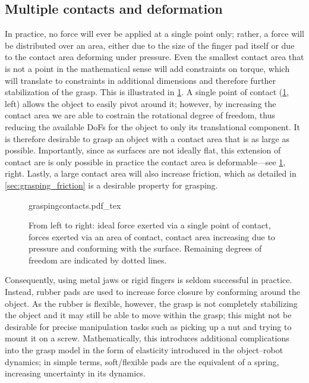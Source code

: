 \subsection{Multiple contacts and deformation}\label{sec:grasping_deformation}

In practice, no force will ever be applied at a single point only; rather, a force will be distributed over an area, either due to the size of the finger pad itself or due to the contact area deforming under pressure.
Even the smallest contact area that is not a point in the mathematical sense will add constraints on torque, which will translate to constraints in additional dimensions and therefore further stabilization of the grasp. This is illustrated in \cref{fig:contactarea}.
A single point of contact (\cref{fig:contactarea}, left) allows the object to easily pivot around it; however, by increasing the contact area we are able to costrain the rotational degree of freedom, thus reducing the available DoFs for the object to only its translational component.
It is therefore desirable to grasp an object with a contact area that is as large as possible. Importantly, since as surfaces are not ideally flat, this extension of contact are is only possible in practice the contact area is deformable---see \cref{fig:contactarea}, right. Lastly, a large contact area will also increase friction, which as detailed in \cref{sec:grasping_friction} is a desirable property for grasping.

\begin{figure}
    \def\svgwidth{\textwidth}
    {graspingcontacts.pdf_tex}
    \caption{From left to right: ideal force exerted via a single point of contact, forces exerted via an area of contact, contact area increasing due to pressure and conforming with the surface. Remaining degrees of freedom are indicated by dotted lines.  \label{fig:contactarea}}
\end{figure}

Consequently, using metal jaws or rigid fingers is seldom successful in practice. Instead, rubber pads are used to increase force closure by conforming around the object. As the rubber is flexible, however, the grasp is not completely stabilizing the object and it may still be able to move within the grasp; this might not be desirable for precise manipulation tasks such as picking up a nut and trying to mount it on a screw. Mathematically, this introduces additional complications into the grasp model in the form of elasticity introduced in the object--robot dynamics; in simple terms, soft/flexible pads are the equivalent of a spring, increasing uncertainty in its dynamics.

